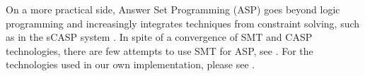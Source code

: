 On a more practical side, Answer Set Programming (ASP) \citep{asp_background}
goes beyond logic programming and increasingly integrates techniques from
constraint solving, such as in the sCASP system
\citep{arias_phd_2019}. In spite of a convergence of SMT and CASP technologies,
there are few attempts to use SMT for ASP, see
\citep{shen_lierler_smt_answer_set_kr_2018}. For the technologies used in our
own implementation, please see . 



